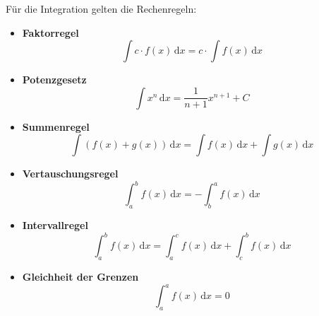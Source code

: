 \documentclass{article}
\newcommand{\diff}{\mathrm{d}}
\begin{document}
\vspace{0.5cm}

Für die Integration gelten die Rechenregeln:
	\begin{itemize}
		\item \textbf{Faktorregel}
			\begin{equation}
				\int c \cdot f(x) \, \diff x = c \cdot \int f(x) \, \diff x
			\end{equation}


		\item \textbf{Potenzgesetz}
			\begin{equation}
				\int x^n \, \diff x = \frac{1}{n+1} x^{n+1} + C
			\end{equation}


		\item \textbf{Summenregel}
			\begin{equation}
				\int (f(x) + g(x)) \, \diff x = \int f(x) \, \diff x + \int g(x) \, \diff x
			\end{equation}


		\item \textbf{Vertauschungsregel}
			\begin{equation}
				\int_a^b f(x) \, \diff x = - \int_b^a f(x) \, \diff x
			\end{equation}


		\item \textbf{Intervallregel}
			\begin{equation}
				\int_a^b f(x) \, \diff x = \int_a^c f(x) \, \diff x + \int_c^b f(x) \, \diff x
			\end{equation}


		\item \textbf{Gleichheit der Grenzen}
			\begin{equation}
				\int_a^a f(x) \, \diff x = 0
			\end{equation}
	\end{itemize}


\newpage
\end{document}
